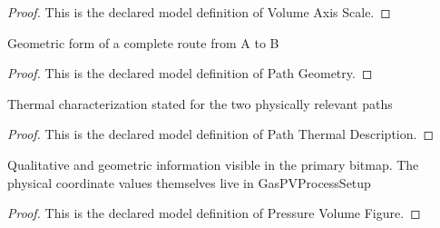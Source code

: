 \begin{proof}
  This is the declared model definition of Volume Axis Scale.
\end{proof}
\begin{definition}
  \label{def:physics:phyx-mini-0356:phyxminiproblems-problemphyxmini0356-pathgeometry}
  Geometric form of a complete route from A to B
\end{definition}
\begin{proof}
  This is the declared model definition of Path Geometry.
\end{proof}
\begin{definition}
  \label{def:physics:phyx-mini-0356:phyxminiproblems-problemphyxmini0356-paththermaldescription}
  Thermal characterization stated for the two physically relevant paths
\end{definition}
\begin{proof}
  This is the declared model definition of Path Thermal Description.
\end{proof}
\begin{definition}
  \label{def:physics:phyx-mini-0356:phyxminiproblems-problemphyxmini0356-pressurevolumefigure}
  Qualitative and geometric information visible in the primary bitmap. The physical coordinate values themselves live in GasPVProcessSetup
\end{definition}
\begin{proof}
  This is the declared model definition of Pressure Volume Figure.
\end{proof}
